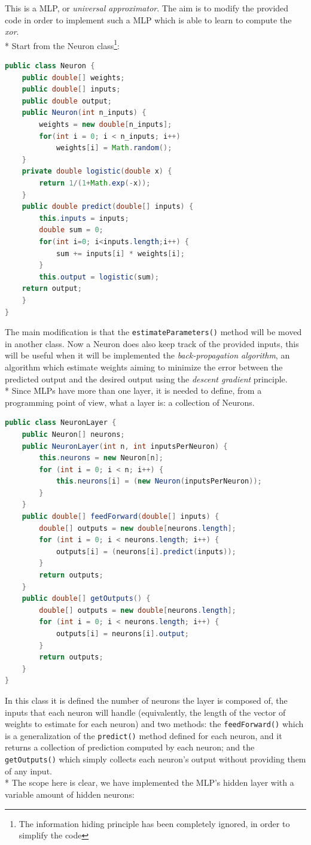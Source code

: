 \documentclass[10pt,a4paper]{article}
\begin{document}
This is a MLP, or \emph{universal approximator}. The aim is to modify the provided code in order to implement such a MLP which is able to learn to compute the \emph{xor}.\\*
Start from the Neuron class\footnote{The information hiding principle has been completely ignored, in order to simplify the code}:
\begin{lstlisting}[language=Java]
public class Neuron {
	public double[] weights;
	public double[] inputs;
	public double output;
	public Neuron(int n_inputs) {
		weights = new double[n_inputs];
		for(int i = 0; i < n_inputs; i++)
			weights[i] = Math.random();
	}
	private double logistic(double x) {
		return 1/(1+Math.exp(-x));
	}
	public double predict(double[] inputs) {
		this.inputs = inputs;
		double sum = 0;
		for(int i=0; i<inputs.length;i++) {
			sum += inputs[i] * weights[i];
		}
		this.output = logistic(sum);
	return output;
	}
}
\end{lstlisting}
The main modification is that the \texttt{estimateParameters()} method will be moved in another class. Now a Neuron does also keep track of the provided inputs, this will be useful when it will be implemented the \emph{back-propagation algorithm}, an algorithm which estimate weights aiming to minimize the error between the predicted output and the desired output using the \emph{descent gradient} principle.\\*
Since MLPs have more than one layer, it is needed to define, from a programming point of view, what a layer is: a collection of Neurons.
\begin{lstlisting}[language=Java]
public class NeuronLayer {
	public Neuron[] neurons;
	public NeuronLayer(int n, int inputsPerNeuron) {
		this.neurons = new Neuron[n];
		for (int i = 0; i < n; i++) {
			this.neurons[i] = (new Neuron(inputsPerNeuron));
		}
	}
	public double[] feedForward(double[] inputs) {
		double[] outputs = new double[neurons.length];
		for (int i = 0; i < neurons.length; i++) {
			outputs[i] = (neurons[i].predict(inputs));
		}
		return outputs;
	}
	public double[] getOutputs() {
		double[] outputs = new double[neurons.length];
		for (int i = 0; i < neurons.length; i++) {
			outputs[i] = neurons[i].output;
		}
		return outputs;
	}
}
\end{lstlisting}
In this class it is defined the number of neurons the layer is composed of, the inputs that each neuron will handle (equivalently, the length of the vector of weights to estimate for each neuron) and two methods: the \texttt{feedForward()} which is a generalization of the \texttt{predict()} method defined for each neuron, and it returns a collection of prediction computed by each neuron; and the \texttt{getOutputs()} which simply collects each neuron's output without providing them of any input.\\* The scope here is clear, we have implemented the MLP's hidden layer with a variable amount of hidden neurons:
\end{document}
